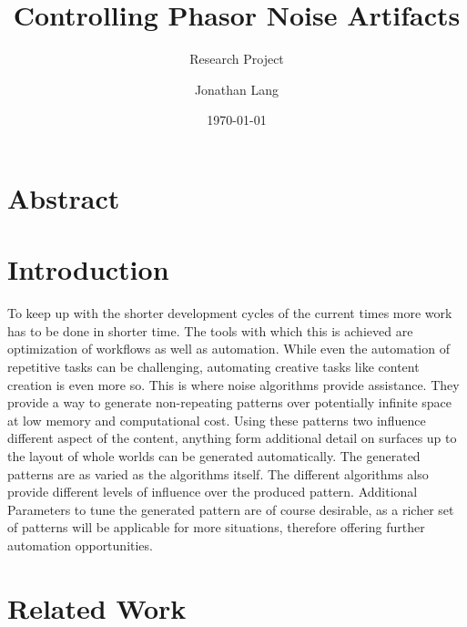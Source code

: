 \documentclass{utue} %
\title{Controlling Phasor Noise Artifacts}
\author{Jonathan Lang}
\date{\today}
\subtitle{Research Project}
\begin{document}

\maketitle 
 
\section*{Abstract}  
  
\section{Introduction}   
To keep up with the shorter development cycles of the current times more work has to be done in shorter time. The tools with which this is achieved are optimization of workflows as well as automation. While even the automation of repetitive tasks can be challenging, automating creative tasks like content creation is even more so. This is where noise algorithms provide assistance. They provide a way to generate non-repeating patterns over potentially infinite space at low memory and computational cost. Using these patterns two influence different aspect of the content, anything form additional detail on surfaces up to the layout of whole worlds can be generated automatically. The generated patterns are as varied as the algorithms itself. The different algorithms also provide different levels of influence over the produced pattern. Additional Parameters to tune the generated pattern are of course desirable, as a richer set of patterns will be applicable for more situations, therefore offering further automation opportunities.


\section{Related Work} 





\end{document}
